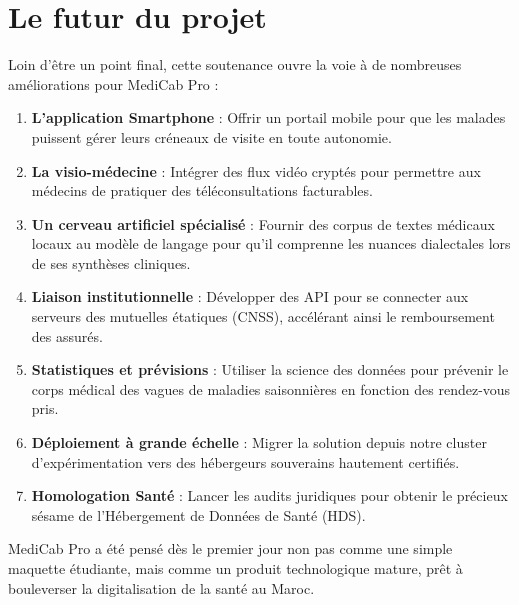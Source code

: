 \documentclass[final]{report}
\begin{document}
\section*{Le futur du projet}
Loin d'être un point final, cette soutenance ouvre la voie à de nombreuses améliorations pour MediCab Pro :
\begin{enumerate}
  \item \textbf{L'application Smartphone} : Offrir un portail mobile pour que les malades puissent gérer leurs créneaux de visite en toute autonomie.
  \item \textbf{La visio-médecine} : Intégrer des flux vidéo cryptés pour permettre aux médecins de pratiquer des téléconsultations facturables.
  \item \textbf{Un cerveau artificiel spécialisé} : Fournir des corpus de textes médicaux locaux au modèle de langage pour qu'il comprenne les nuances dialectales lors de ses synthèses cliniques.
  \item \textbf{Liaison institutionnelle} : Développer des API pour se connecter aux serveurs des mutuelles étatiques (CNSS), accélérant ainsi le remboursement des assurés.
  \item \textbf{Statistiques et prévisions} : Utiliser la science des données pour prévenir le corps médical des vagues de maladies saisonnières en fonction des rendez-vous pris.
  \item \textbf{Déploiement à grande échelle} : Migrer la solution depuis notre cluster d'expérimentation vers des hébergeurs souverains hautement certifiés.
  \item \textbf{Homologation Santé} : Lancer les audits juridiques pour obtenir le précieux sésame de l'Hébergement de Données de Santé (HDS).
\end{enumerate}
 
MediCab Pro a été pensé dès le premier jour non pas comme une simple maquette étudiante, mais comme un produit technologique mature, prêt à bouleverser la digitalisation de la santé au Maroc.
 
\end{document}

